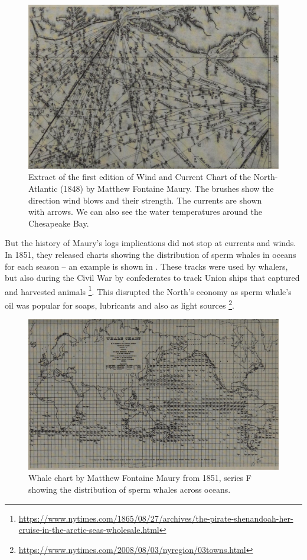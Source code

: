 \begin{figure}[ht]
    \centering
    \includegraphics[width=.7\textwidth]{chapters/images/windmaps.pdf}
    \caption{Extract of the first edition of Wind and Current Chart of the North-Atlantic (1848) by Matthew Fontaine Maury. The brushes show the direction wind blows and their strength. The currents are shown with arrows. We can also see the water temperatures around the Chesapeake Bay.}
    \label{fig:wind-current}
\end{figure}

But the history of Maury's logs implications did not stop at currents and winds. In 1851, they released charts showing the distribution of sperm whales in oceans for each season -- an example is shown in . These tracks were used by whalers, but also during the Civil War by confederates to track Union ships that captured and harvested animals \footnote{\url{https://www.nytimes.com/1865/08/27/archives/the-pirate-shenandoah-her-cruise-in-the-arctic-seas-wholesale.html}}. This disrupted the North's economy as sperm whale's oil was popular for soaps, lubricants and also as light sources \footnote{\url{https://www.nytimes.com/2008/08/03/nyregion/03towns.html}}.
\begin{figure}[ht]
    \centering
    \includegraphics[width=.7\textwidth]{chapters/images/whales.pdf}
    \caption{Whale chart by Matthew Fontaine Maury from 1851, series F showing the distribution of sperm whales across oceans.}
    \label{fig:whale-chart}
\end{figure}

